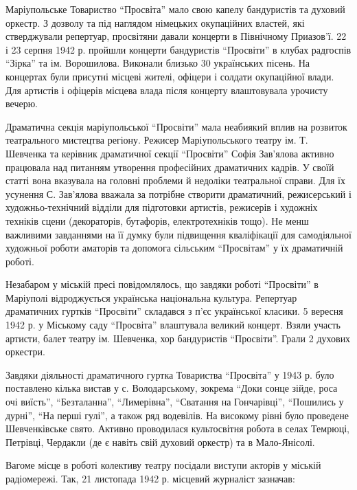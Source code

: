 Маріупольське Товариство \enquote{Просвіта} мало свою капелу бандуристів та духовий
оркестр. З дозволу та під наглядом німецьких окупаційних властей, які
стверджували репертуар, просвітяни давали концерти в Північному Приазов'ї. 22 і
23 серпня 1942 р. пройшли концерти бандуристів \enquote{Просвіти} в клубах радгоспів
\enquote{Зірка} та ім. Ворошилова. Виконали близько 30 українських пісень. На концертах
були присутні місцеві жителі, офіцери і солдати окупаційної влади. Для артистів
і офіцерів місцева влада після концерту влаштовувала урочисту вечерю.

Драматична секція маріупольської \enquote{Просвіти} мала неабиякий вплив на розвиток
театрального мистецтва регіону. Режисер Маріупольського театру ім. Т. Шевченка
та керівник драматичної секції \enquote{Просвіти} Софія Зав'ялова активно працювала над
питанням утворення професійних драматичних кадрів. У своїй статті вона
вказувала на головні проблеми й недоліки театральної справи. Для їх усунення С.
Зав'ялова вважала за потрібне створити драматичний, режисерський і
художньо-технічний відділи для підготовки артистів, режисерів і художніх
техніків сцени (декораторів, бутафорів, електротехніків тощо). Не менш
важливими завданнями на її думку були підвищення кваліфікації для самодіяльної
художньої роботи аматорів та допомога сільським \enquote{Просвітам} у їх драматичній
роботі.

Незабаром у міській пресі повідомлялось, що завдяки роботі \enquote{Просвіти} в
Маріуполі відроджується українська національна культура. Репертуар драматичних
гуртків \enquote{Просвіти} складався з п'єс української класики. 5 вересня 1942 р. у
Міському саду \enquote{Просвіта} влаштувала великий концерт. Взяли участь артисти,
балет театру ім. Шевченка, хор бандуристів \enquote{Просвіти}. Грали 2 духових
оркестри.

Завдяки діяльності драматичного гуртка Товариства \enquote{Просвіта} у 1943 р. було
поставлено кілька вистав у с. Володарському, зокрема \enquote{Доки сонце зійде, роса
очі виїсть}, \enquote{Безталанна}, \enquote{Лимерівна}, \enquote{Сватання на Гончарівці}, \enquote{Пошились у
дурні}, \enquote{На перші гулі}, а також ряд водевілів. На високому рівні було
проведене Шевченківське свято. Активно проводилася культосвітня робота в селах
Темрюці, Петрівці, Чердакли (де є навіть свій духовий оркестр) та в
Мало-Янісолі.

Вагоме місце в роботі колективу театру посідали виступи акторів у міській
радіомережі. Так, 21 листопада 1942 р. місцевий журналіст зазначав: 

